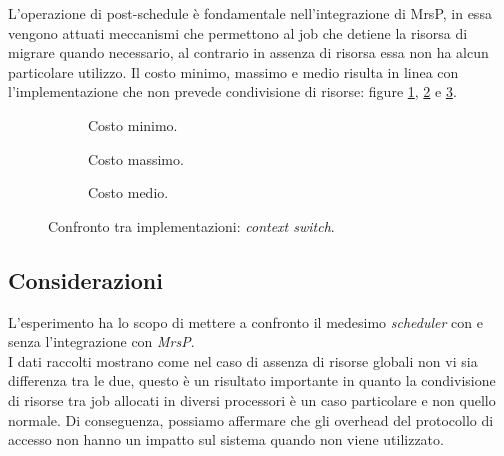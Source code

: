 L'operazione di post-schedule è fondamentale nell'integrazione di MrsP, in essa vengono attuati meccanismi che permettono al job che detiene la risorsa di migrare quando necessario, al contrario in assenza di risorsa essa non ha alcun particolare utilizzo. Il costo minimo, massimo e medio risulta in linea con l'implementazione che non prevede condivisione di risorse: figure \ref{fig:cxsMin}, \ref{fig:cxsMax} e \ref{fig:cxsAvg}.\\

  \begin{figure}[htb]
    \centering
      \begin{subfigure}[b]{0.49\textwidth}
        \centering
        \resizebox{\linewidth}{!}\graficoCxsMIN  
        \caption{Costo minimo.}
        \label{fig:cxsMin}
      \end{subfigure}
      \begin{subfigure}[b]{0.49\textwidth}
        \centering
        \resizebox{\linewidth}{!}\graficoCxsMAX
        \caption{Costo massimo.}
        \label{fig:cxsMax}
      \end{subfigure}
      \begin{subfigure}[b]{0.49\textwidth}
        \centering
        \resizebox{\linewidth}{!}\graficoCxsAVG
        \caption{Costo medio.}
        \label{fig:cxsAvg}
      \end{subfigure}

    \caption{Confronto tra implementazioni: \textit{context switch}.}
    \label{fig:cxs}
  \end{figure}

\subsection{Considerazioni}
\label{sec:confronto_norisorsa_cons}

L'esperimento ha lo scopo di mettere a confronto il medesimo \textit{scheduler} con e senza l'integrazione con \textit{MrsP}.\\

I dati raccolti mostrano come nel caso di assenza di risorse globali non vi sia differenza tra le due, questo è un risultato importante in quanto la condivisione di risorse tra job allocati in diversi processori è un caso particolare e non quello normale. Di conseguenza, possiamo affermare che gli overhead del protocollo di accesso non hanno un impatto sul sistema quando non viene utilizzato.\\